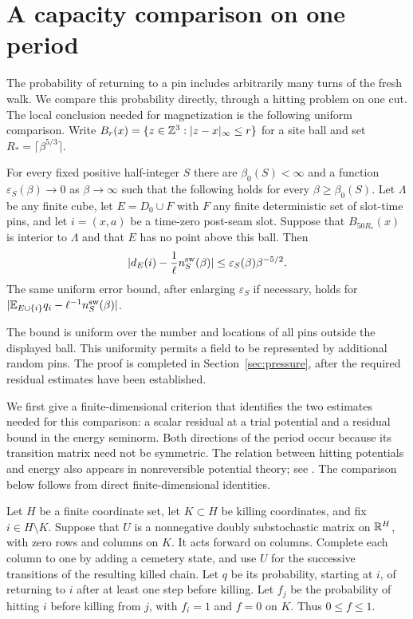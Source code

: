 \section{A capacity comparison on one period}\label{sec:capacity}

The probability of returning to a pin includes arbitrarily many turns
of the fresh walk.  We compare this probability directly, through a
hitting problem on one cut.  The local conclusion needed for
magnetization is the following uniform comparison.  Write
$B_r(x)=\{z\in\mathbb Z^3:|z-x|_\infty\le r\}$ for a site ball and set
$R_*=\lceil\beta^{5/3}\rceil$.

\begin{proposition}\label{prop:comparison}
For every fixed positive half-integer $S$ there are
$\beta_0(S)<\infty$ and a function $\varepsilon_S(\beta)\to0$
as $\beta\to\infty$ such that the following holds for every
$\beta\ge\beta_0(S)$.
Let $\Lambda$ be any finite cube, let $E=D_0\cup F$ with $F$ any
finite deterministic set of slot-time pins, and let $i=(x,a)$ be a
time-zero post-seam slot.  Suppose that $B_{50R_*}(x)$ is interior
to $\Lambda$ and that $E$ has no point above this ball.  Then
\begin{equation}\label{eq:pinnedcomparison}
 \lvert d_E(i)-\frac1\ell n_S^{\rm sw}(\beta)\rvert
 \le \varepsilon_S(\beta)\beta^{-5/2}.
\end{equation}
The same uniform error bound, after enlarging $\varepsilon_S$ if
necessary, holds for
$\lvert \mathbb E_{E\cup\{i\}}q_i-\ell^{-1}n_S^{\rm sw}(\beta)\rvert$.
\end{proposition}

The bound is uniform over the number and locations of all pins
outside the displayed ball.  This uniformity permits a field to be
represented by additional random pins.  The proof is completed in
Section~\ref{sec:pressure}, after the required residual estimates
have been established.

We first give a finite-dimensional criterion that identifies the two
estimates needed for this comparison: a scalar residual at a trial
potential and a residual bound in the energy seminorm.  Both directions
of the period occur because its transition matrix need not be symmetric.
The relation between hitting potentials and energy also appears in
nonreversible potential theory; see
\cite[Section~2, Equation~(2.6)]{GaudilliereLandim2014}.
The comparison below follows from direct finite-dimensional identities.

Let $H$ be a finite coordinate set, let $K\subset H$ be killing
coordinates, and fix $i\in H\setminus K$.  Suppose that $U$ is a
nonnegative doubly substochastic matrix on $\mathbb R^H$, with zero rows and
columns on $K$.  It acts forward on columns.  Complete each column to
one by adding a cemetery state, and use $U$ for the successive
transitions of the resulting killed chain.  Let $q$ be its probability,
starting at $i$, of returning to $i$ after at least one step before
killing.  Let $f_j$ be the probability of hitting $i$ before killing
from $j$, with $f_i=1$ and $f=0$ on $K$.  Thus $0\le f\le1$.

